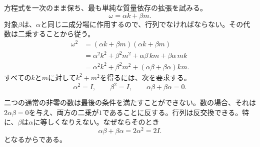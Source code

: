 方程式を一次のまま保ち、最も単純な質量依存の拡張を試みる。
\begin{equation}
\omega=\alpha k+\beta m.
\end{equation}
対象\(\beta\)は、\(\alpha\)と同じ二成分場に作用するので、行列でなければならない。その代数は二乗することから従う。
\begin{align}
\omega^2
&=(\alpha k+\beta m)(\alpha k+\beta m)\\
&=\alpha^2k^2+\beta^2m^2
+\alpha\beta\,km+\beta\alpha\,mk\\
&=\alpha^2k^2+\beta^2m^2
+(\alpha\beta+\beta\alpha)km.
\end{align}
すべての\(k\)と\(m\)に対して\(k^2+m^2\)を得るには、次を要求する。
\begin{equation}
\alpha^2=I,
\qquad
\beta^2=I,
\qquad
\alpha\beta+\beta\alpha=0.
\end{equation}

二つの通常の非零の数は最後の条件を満たすことができない。数の場合、それは\(2\alpha\beta=0\)を与え、両方の二乗が\(1\)であることに反する。行列は反交換できる。特に、\(\beta\)は\(\alpha\)に等しくなりえない。なぜならそのとき
\begin{equation}
\alpha\beta+\beta\alpha=2\alpha^2=2I.
\end{equation}
となるからである。

